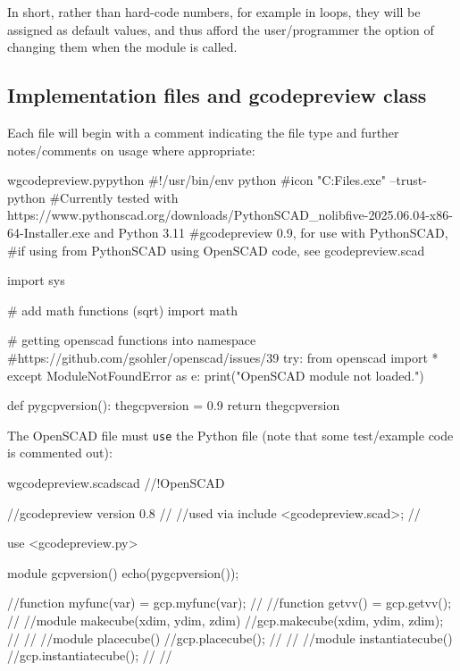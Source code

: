 \documentclass{ltxdoc}
\begin{document}
In short, rather than hard-code numbers, for example in loops, they will be assigned as default values, and thus afford the user/programmer the option of changing them when the module is called. 


\subsection{Implementation files and gcodepreview class}
 
Each file will begin with a comment indicating the file type and further notes/comments on usage where appropriate:

\begin{writecode}{w}{gcodepreview.py}{python}
#!/usr/bin/env python
#icon "C:\Program Files\PythonSCAD\bin\openscad.exe" --trust-python
#Currently tested with https://www.pythonscad.org/downloads/PythonSCAD_nolibfive-2025.06.04-x86-64-Installer.exe and Python 3.11
#gcodepreview 0.9, for use with PythonSCAD, 
#if using from PythonSCAD using OpenSCAD code, see gcodepreview.scad

import sys

# add math functions (sqrt)
import math

# getting openscad functions into namespace
#https://github.com/gsohler/openscad/issues/39
try:
    from openscad import *
except ModuleNotFoundError as e:
    print("OpenSCAD module not loaded.")
    
def pygcpversion():
    thegcpversion = 0.9
    return thegcpversion
 
\end{writecode}
\addtocounter{gcpy}{23}

The OpenSCAD file must \verb|use| the Python file (note that some test/example code is commented out):

\begin{writecode}{w}{gcodepreview.scad}{scad}
//!OpenSCAD
 
//gcodepreview version 0.8
//
//used via include <gcodepreview.scad>;
//

use <gcodepreview.py>

module gcpversion(){
echo(pygcpversion());
}

//function myfunc(var) = gcp.myfunc(var);
//
//function getvv() = gcp.getvv();
//
//module makecube(xdim, ydim, zdim){
//gcp.makecube(xdim, ydim, zdim);
//}
//
//module placecube(){
//gcp.placecube();
//}
//
//module instantiatecube(){
//gcp.instantiatecube();
//}
//
\end{writecode}
\addtocounter{gcpscad}{30}
\end{document}
